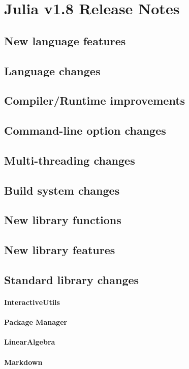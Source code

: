\part{Julia v1.8 Release Notes}
  \chapter{New language features}
  \chapter{Language changes}
  \chapter{Compiler/Runtime improvements}
  \chapter{Command-line option changes}
  \chapter{Multi-threading changes}
  \chapter{Build system changes}
  \chapter{New library functions}
  \chapter{New library features}
  \chapter{Standard library changes}
    \subsection{InteractiveUtils}
    \subsection{Package Manager}
    \subsection{LinearAlgebra}
    \subsection{Markdown}
